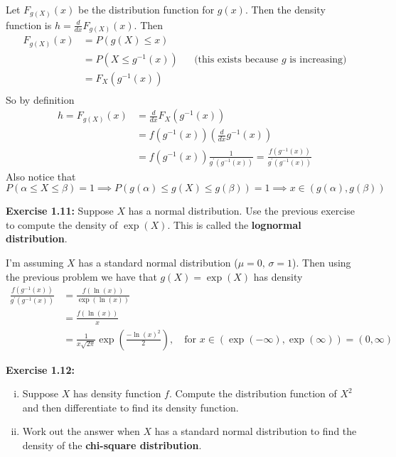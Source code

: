 \begin{mdframed}
    Let $F_{g(X)}(x)$ be the distribution function for $g(x)$. Then the density function is $h = \frac{d}{dx}F_{g(X)}(x)$. Then  
    \begin{align*}
        F_{g(X)}(x) &= P(g(X) \leq x) \\
        &= P(X \leq g^{-1}(x)) && \text{(this exists because $g$ is increasing)} \\
        &= F_X(g^{-1}(x)) \\
    \end{align*}
    So by definition 
    \begin{align*}
        h = F_{g(X)}(x) &= \frac{d}{dx}F_X(g^{-1}(x)) \\
        &=f(g^{-1}(x)) \left(\frac{d}{dx}g^{-1}(x) \right)\\
        &=f(g^{-1}(x))\frac{1}{g^\prime(g^{-1}(x))} = \frac{f(g^{-1}(x))}{g^\prime(g^{-1}(x))} 
    \end{align*}
    Also notice that 
    \[P(\alpha \leq X \leq \beta)=1 \implies P(g(\alpha) \leq g(X) \leq g(\beta)) = 1 \implies x \in (g(\alpha), g(\beta))\]
\end{mdframed}
\textbf{Exercise 1.11:} Suppose $X$ has a normal distribution. Use the previous exercise to compute the density of $\exp(X)$. This is called the \textbf{lognormal distribution}.
\begin{mdframed}
    I'm assuming $X$ has a standard normal distribution ($\mu = 0, \, \sigma=1$). Then using the previous problem we have that $g(X) = \exp(X)$ has density
    \begin{align*}
        \frac{f(g^{-1} (x))}{g^\prime(g^{-1}(x))} &= \frac{f(\ln(x))}{\exp(\ln(x))}\\
        &= \frac{f(\ln(x))}{x} \\
        &= \frac{1}{x\sqrt{2\pi}}\exp\left(\frac{-\ln(x)^2}{2}\right), \quad \text{for $x \in (\exp(-\infty), \exp(\infty)) = (0, \infty)$}
    \end{align*}
\end{mdframed}
\textbf{Exercise 1.12:} 
\begin{enumerate}[i)]
    \item Suppose $X$ has density function $f$. Compute the distribution function of $X^2$ and then differentiate to find its density function.
    \item Work out the answer when $X$ has a standard normal distribution to find the density of the \textbf{chi-square distribution}.
\end{enumerate}
\begin{mdframed}
    
\end{mdframed}




